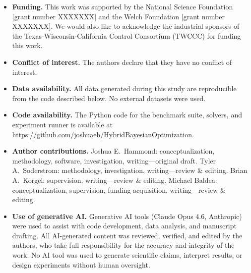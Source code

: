 \documentclass[12pt,a4paper]{article}%
\theoremstyle{plain}%
\theoremstyle{remark}%
\theoremstyle{definition}%
\providecommand{\DIFaddbegin}{} %
\providecommand{\DIFdelend}{} %
\newcommand{\DIFaddincludegraphics}[2][]{{\color{blue}\fbox{\DIFOincludegraphics[#1]{#2}}}} %
\DeclareRobustCommand{\DIFaddbegin}{\DIFOaddbegin \let\includegraphics\DIFaddincludegraphics} %
\DeclareRobustCommand{\DIFdelend}{\DIFOaddend \let\includegraphics\DIFOincludegraphics} %
\begin{document}
\DIFdelend \DIFaddbegin \begin{itemize}
\item \textbf{Funding.} This work was supported by the National Science Foundation [grant number XXXXXXX] and the Welch Foundation [grant number XXXXXXX]. We would also like to acknowledge the industrial sponsors of the Texas-Wisconsin-California Control Consortium (TWCCC) for funding this work.

\item \textbf{Conflict of interest.} The authors declare that they have no conflict of interest.

\item \textbf{Data availability.} All data generated during this study are reproducible from the code described below. No external datasets were used.

\item \textbf{Code availability.} The Python code for the benchmark suite, solvers, and experiment runner is available at \url{https://github.com/joshuaeh/HybridBayesianOptimization}.

\item \textbf{Author contributions.} Joshua E.\ Hammond: conceptualization, methodology, software, investigation, writing---original draft. Tyler A.\ Soderstrom: methodology, investigation, writing---review \& editing. Brian A.\ Korgel: supervision, writing---review \& editing. Michael Baldea: conceptualization, supervision, funding acquisition, writing---review \& editing.

\item \textbf{Use of generative AI.} Generative AI tools (Claude Opus 4.6, Anthropic) were used to assist with code development, data analysis, and manuscript drafting. All AI-generated content was reviewed, verified, and edited by the authors, who take full responsibility for the accuracy and integrity of the work. No AI tool was used to generate scientific claims, interpret results, or design experiments without human oversight.
\end{itemize}
\end{document}
